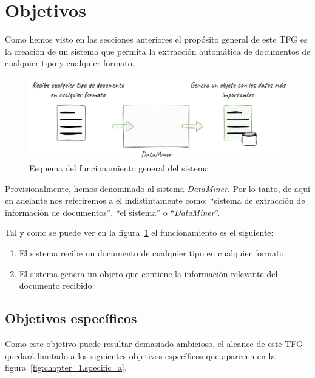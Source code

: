 \section{Objetivos}\label{sec:objetives}

Como hemos visto en las secciones anteriores el propósito general de este TFG es la creación de un sistema que permita
la extracción automática de documentos de cualquier tipo y cualquier formato.

\begin{figure}[ht]
    \begin{center}
        \includegraphics[width=\textwidth]{./chapter/1/images/chapter_1.overview}
        \caption{Esquema del funcionamiento general del sistema}
        \label{fig:chapter_1.overview}
    \end{center}
\end{figure}

Provisionalmente, hemos denominado al sistema \textit{DataMiner}.
Por lo tanto, de aquí en adelante nos referiremos a él indistintamente como: ``sistema de extracción de información de
documentos'', ``el sistema'' o ``\textit{DataMiner}''.

Tal y como se puede ver en la figura~\ref{fig:chapter_1.overview} el funcionamiento es el siguiente:

\begin{enumerate}
    \item
    El sistema recibe un documento de cualquier tipo en cualquier formato.

    \item
    El sistema genera un objeto que contiene la información relevante del documento recibido.
\end{enumerate}

\subsection*{Objetivos específicos}

Como este objetivo puede resultar demasiado ambicioso, el alcance de este TFG quedará limitado a los siguientes
objetivos específicos que aparecen en la figura~\ref{fig:chapter_1.specific_a}.

